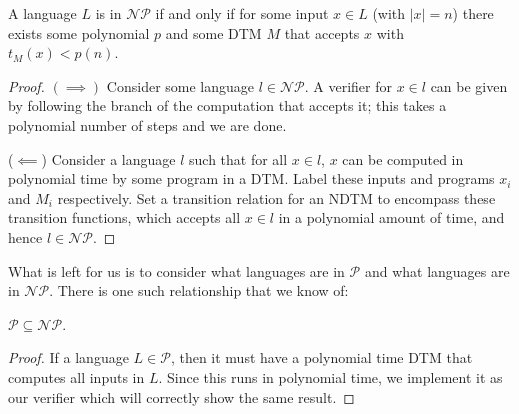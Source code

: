 \begin{proposition}
    A language $L$ is in $\mathcal{NP}$ if and only if for some input $x \in L$ (with $|x| = n$) there exists some polynomial $p$ and some DTM $M$ that accepts $x$ with $t_M(x) < p(n)$.
\end{proposition}

\begin{proof}
    $(\implies)$ Consider some language $l \in \mathcal{NP}$. A verifier for $x \in l$ can be given by following the branch of the computation that accepts it; this takes a polynomial number of steps and we are done.

    ($\impliedby$) Consider a language $l$ such that for all $x \in l$, $x$ can be computed in polynomial time by some program in a DTM. Label these inputs and programs $x_i$ and $M_i$ respectively. Set a transition relation for an NDTM to encompass these transition functions, which accepts all $x \in l$ in a polynomial amount of time, and hence $l \in \mathcal{NP}$.
\end{proof}

What is left for us is to consider what languages are in $\mathcal{P}$ and what languages are in $\mathcal{NP}$. There is one such relationship that we know of:


\begin{corollary} \label{corollary: P subset NP}
    $\mathcal{P} \subseteq \mathcal{NP}$.
\end{corollary}
\begin{proof}
    If a language $L \in \mathcal{P}$, then it must have a polynomial time DTM that computes all inputs in $L$. Since this runs in polynomial time, we implement it as our verifier which will correctly show the same result.
\end{proof}